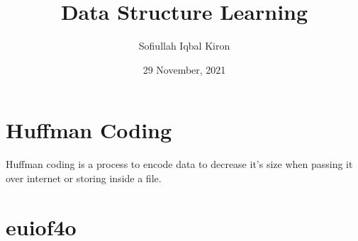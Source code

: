 \documentclass[11pt]{article}
\title{Data Structure Learning}
\author{Sofiullah Iqbal Kiron}
\date{29 November, 2021}
\begin{document}
\maketitle

\pagebreak

\tableofcontents

\pagebreak

\section{Huffman Coding}
Huffman coding is a process to encode data to decrease it's size when passing it over internet or storing inside a file.

\section{euiof4o}
\end{document}
